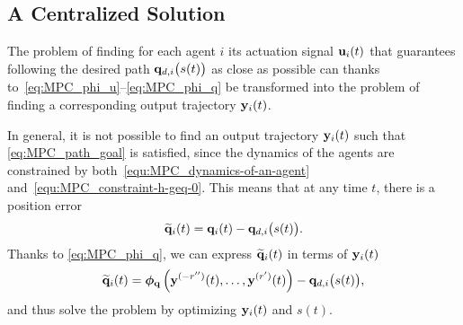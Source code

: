 \subsection{A Centralized Solution}
\label{ssec:MPC_centralized}



The problem of finding for each agent $i$ its actuation signal $\mathbf{u}_i(t)$ that guarantees following the desired path $\mathbf{q}_{d,i} \big( s(t) \big)$ as close as possible can thanks to~\eqref{eq:MPC_phi_u}--\eqref{eq:MPC_phi_q} be transformed into the problem of finding a corresponding output trajectory $\mathbf{y}_i(t)$.

In general, it is not possible to find an output trajectory $\mathbf{y}_i(t)$ such that \eqref{eq:MPC_path_goal} is satisfied, since the dynamics of the agents are constrained by both~\eqref{equ:MPC_dynamics-of-an-agent} and~\eqref{equ:MPC_constraint-h-geq-0}. This means that at any time $t$, there is a position error
%
\begin{equation}
    \widetilde{\mathbf{q}}_i(t)
    =
    \mathbf{q}_i(t)
    -
    \mathbf{q}_{d,i} \big( s(t) \big) .
    \label{eq:MPC_q_tilde}
\end{equation}
%
Thanks to \eqref{eq:MPC_phi_q}, we can express $\widetilde{\mathbf{q}}_i(t)$ in terms of $\mathbf{y}_i(t)$
\begin{equation}
    \widetilde{\mathbf{q}}_i(t)
    =
    \bm{\phi}_{\mathbf{q}}\left(\mathbf{y}^{(-r'')}(t), \ldots, \mathbf{y}^{(r')}(t)\right)
    -
    \mathbf{q}_{d,i} \big( s(t) \big), \label{eq:MPC_y_tilde}
\end{equation}
and thus solve the problem by optimizing $\mathbf{y}_i(t)$ and $s(t)$.


